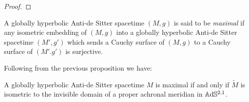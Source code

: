 \begin{proof}
\end{proof}
\begin{definition}
    A globally hyperbolic Anti-de Sitter spacetime $(M,g)$ is said to be \textit{maximal} if any isometric embedding of $(M,g)$ into a globally hyperbolic Anti-de Sitter spacetime $(M',g')$ which sends a Cauchy surface of $(M,g)$ to a Cauchy surface of $(M'.g')$ is surjective.
\end{definition}
Following from the previous proposition we have:
\begin{corollary}
    A globally hyperbolic Anti-de Sitter spacetime $M$ is maximal if and only if $\widetilde{M}$ is isometric to the invisible domain of a proper achronal meridian in $\mathbb{A}\mathrm{d}\mathbb{S}^{2,1}$.
\end{corollary}

